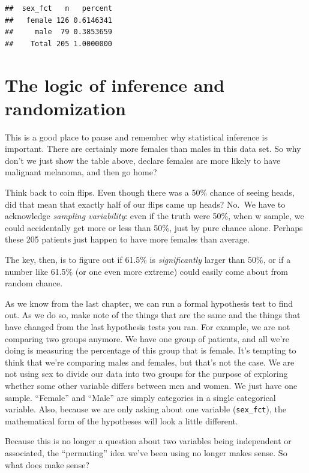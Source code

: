 \documentclass[
]{book}
\begin{document}
\begin{verbatim}
##  sex_fct   n   percent
##   female 126 0.6146341
##     male  79 0.3853659
##    Total 205 1.0000000
\end{verbatim}

\hypertarget{hypothesis2-logic}{%
\section{The logic of inference and randomization}\label{hypothesis2-logic}}

This is a good place to pause and remember why statistical inference is important. There are certainly more females than males in this data set. So why don't we just show the table above, declare females are more likely to have malignant melanoma, and then go home?

Think back to coin flips. Even though there was a 50\% chance of seeing heads, did that mean that exactly half of our flips came up heads? No.~We have to acknowledge \emph{sampling variability}: even if the truth were 50\%, when w sample, we could accidentally get more or less than 50\%, just by pure chance alone. Perhaps these 205 patients just happen to have more females than average.

The key, then, is to figure out if 61.5\% is \emph{significantly} larger than 50\%, or if a number like 61.5\% (or one even more extreme) could easily come about from random chance.

As we know from the last chapter, we can run a formal hypothesis test to find out. As we do so, make note of the things that are the same and the things that have changed from the last hypothesis tests you ran. For example, we are not comparing two groups anymore. We have one group of patients, and all we're doing is measuring the percentage of this group that is female. It's tempting to think that we're comparing males and females, but that's not the case. We are not using sex to divide our data into two groups for the purpose of exploring whether some other variable differs between men and women. We just have one sample. ``Female'' and ``Male'' are simply categories in a single categorical variable. Also, because we are only asking about one variable (\texttt{sex\_fct}), the mathematical form of the hypotheses will look a little different.

Because this is no longer a question about two variables being independent or associated, the ``permuting'' idea we've been using no longer makes sense. So what does make sense?
\end{document}
